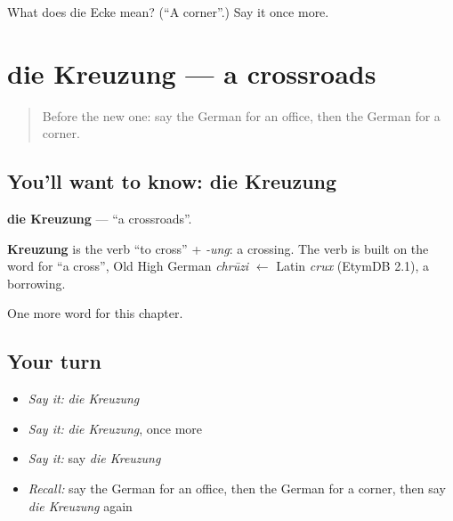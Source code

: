 \begin{tcolorbox}[breakable,colback=teal!4,colframe=teal!35!black,title={Before you move on}]
What does die Ecke mean? (\textquotedblleft{}A corner\textquotedblright{}.) Say it once more.
\end{tcolorbox}
\section[die Kreuzung]{die Kreuzung — a crossroads}

\label{lesson:GE-C107-kreuzung}



\begin{quote}
Before the new one: say the German for an office, then the German for a corner.
\end{quote}

\subsection*{You'll want to know: die Kreuzung}
\textbf{die Kreuzung} — \textquotedblleft{}a crossroads\textquotedblright{}.

\begin{cousinweb}
\textbf{Kreuzung} is the verb \textquotedblleft{}to cross\textquotedblright{} + \emph{-ung}: a crossing. The verb is built on the word for \textquotedblleft{}a cross\textquotedblright{}, Old High German \emph{chrūzi} $\leftarrow$ Latin \emph{crux} (EtymDB 2.1), a borrowing.
\end{cousinweb}

\begin{grammarlens}[title={What you've built}]
One more word for this chapter.
\end{grammarlens}

\subsection*{Your turn}
\begin{itemize}
\raggedright
  \item \emph{Say it:} \emph{die Kreuzung}
  \item \emph{Say it:} \emph{die Kreuzung}, once more
  \item \emph{Say it:} say \emph{die Kreuzung}
  \item \emph{Recall:} say the German for an office, then the German for a corner, then say \emph{die Kreuzung} again
\end{itemize}

